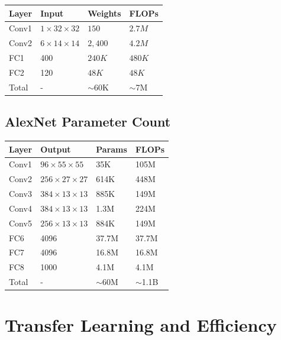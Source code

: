 \begin{table}[ht]
    \centering
    \begin{tabular}{L{2.5cm} L{2cm} L{2cm} L{2cm}}
        \toprule
        \textbf{Layer} & \textbf{Input} & \textbf{Weights} & \textbf{FLOPs} \\
        \midrule
        Conv1 & $1\times32\times32$ & $150$ & $2.7M$ \\
        Conv2 & $6\times14\times14$ & $2,400$ & $4.2M$ \\
        FC1 & 400 & $240K$ & $480K$ \\
        FC2 & 120 & $48K$ & $48K$ \\
        \midrule
        Total & - & $\sim$60K & $\sim$7M \\
        \bottomrule
    \end{tabular}
\end{table}

\subsection{AlexNet Parameter Count}

\begin{table}[ht]
    \centering
    \begin{tabular}{L{2cm} L{2.5cm} L{2cm} L{2cm}}
        \toprule
        \textbf{Layer} & \textbf{Output} & \textbf{Params} & \textbf{FLOPs} \\
        \midrule
        Conv1 & $96\times55\times55$ & 35K & 105M \\
        Conv2 & $256\times27\times27$ & 614K & 448M \\
        Conv3 & $384\times13\times13$ & 885K & 149M \\
        Conv4 & $384\times13\times13$ & 1.3M & 224M \\
        Conv5 & $256\times13\times13$ & 884K & 149M \\
        FC6 & 4096 & 37.7M & 37.7M \\
        FC7 & 4096 & 16.8M & 16.8M \\
        FC8 & 1000 & 4.1M & 4.1M \\
        \midrule
        Total & - & $\sim$60M & $\sim$1.1B \\
        \bottomrule
    \end{tabular}
\end{table}

\section{Transfer Learning and Efficiency}

